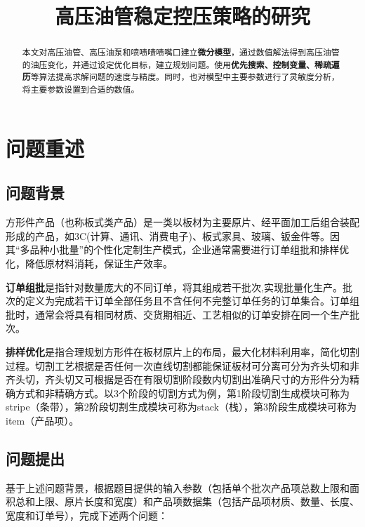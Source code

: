\documentclass[bwprint]{gmcmthesis}
\title{高压油管稳定控压策略的研究}
\begin{document}
\sloppy

 \maketitle

\begin{abstract}
本文对高压油管、高压油泵和喷啧啧啧嘴口建立\textbf{微分模型}，通过数值解法得到高压油管的油压变化，并通过设定优化目标，建立规划问题。使用\textbf{优先搜索、控制变量、稀疏遍历}等算法提高求解问题的速度与精度。同时，也对模型中主要参数进行了灵敏度分析，将主要参数设置到合适的数值。
\end{abstract}


\section{问题重述}
\subsection{问题背景}

方形件产品（也称板式类产品）是一类以板材为主要原片、经平面加工后组合装配形成的产品，如3C(计算、通讯、消费电子)、板式家具、玻璃、钣金件等。因其“多品种小批量”的个性化定制生产模式，企业通常需要进行订单组批和排样优化，降低原材料消耗，保证生产效率。

\textbf{订单组批}是指针对数量庞大的不同订单，将其组成若干批次,实现批量化生产。批次的定义为完成若干订单全部任务且不含任何不完整订单任务的订单集合。订单组批时，通常会将具有相同材质、交货期相近、工艺相似的订单安排在同一个生产批次。

\textbf{排样优化}是指合理规划方形件在板材原片上的布局，最大化材料利用率，简化切割过程。切割工艺根据是否任何一次直线切割都能保证板材可分离可分为齐头切和非齐头切，齐头切又可根据是否在有限切割阶段数内切割出准确尺寸的方形件分为精确方式和非精确方式。以3个阶段的切割方式为例，第1阶段切割生成模块可称为stripe（条带），第2阶段切割生成模块可称为stack（栈），第3阶段生成模块可称为item（产品项）。

\quad
\subsection{问题提出}
基于上述问题背景，根据题目提供的输入参数（包括单个批次产品项总数上限和面积总和上限、原片长度和宽度）和产品项数据集（包括产品项材质、数量、长度、宽度和订单号），完成下述两个问题：
\end{document}

